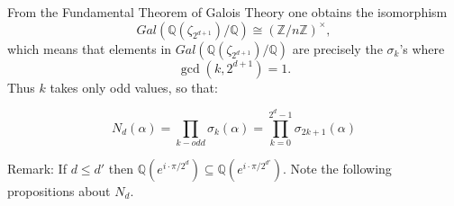\documentclass[12pt]{dalthesis}
\begin{document}

From the Fundamental Theorem of Galois Theory one obtains the isomorphism 
\[
Gal(\mathbb{Q}(\zeta_{2^{d+1}})/\mathbb{Q}) \cong (\mathbb{Z}/n\mathbb{Z})^\times,
\]
which means that elements in $Gal(\mathbb{Q}(\zeta_{2^{d+1}})/\mathbb{Q})$ are precisely the $\sigma_k$'s where 
\[
\gcd(k, 2^{d+1}) = 1.
\]
Thus $k$ takes only odd values, so that:

\begin{equation}
N_d(\alpha) = \prod_{k-odd} \sigma_k (\alpha) = \prod_{k=0}^{2^d - 1} \sigma_{2k+1} (\alpha)
\end{equation}

Remark: If $d \leq d'$ then $\mathbb{Q}(e^{i\cdot \pi / 2^d}) \subseteq \mathbb{Q}(e^{i\cdot \pi / 2^{d'}})$. Note the following propositions about $N_d$.
\end{document}
